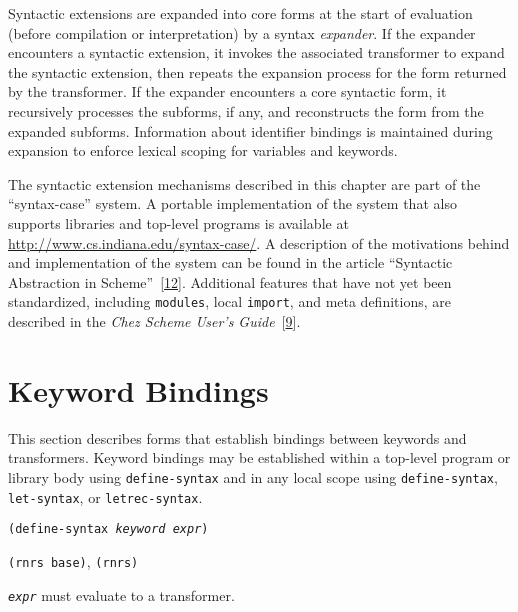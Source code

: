Syntactic extensions are expanded into core forms at the start of
evaluation (before compilation or interpretation) by a syntax \textit{expander}.
If the expander encounters a syntactic extension, it invokes
the associated transformer to expand the syntactic extension, then
repeats the expansion process for the form returned by the transformer.
If the expander encounters a core syntactic form, it recursively
processes the subforms, if any, and reconstructs the form from the
expanded subforms.
Information about identifier bindings is maintained during expansion
to enforce lexical scoping for variables and keywords.


The syntactic extension mechanisms described in this chapter are part of
the ``syntax-case'' system.
A portable implementation of the system that also supports libraries
and top-level programs is available at
\url{http://www.cs.indiana.edu/syntax-case/}.
A description of the motivations behind and implementation of the
system can be found in the article
``Syntactic Abstraction in Scheme'' [\hyperref[bibliography_g230]{12}].
Additional features that have not yet been standardized, including
\texttt{modules}, local \texttt{import}, and meta definitions, are
described in the \textit{Chez Scheme User's Guide} [\hyperref[bibliography_g227]{9}].


\section{\label{syntax_g134}\label{syntax_h1}Keyword Bindings\label{syntax_SECTSYNTAXDEFINITIONS}}



This section describes forms that establish
bindings between \label{syntax_s11}keywords and transformers.
Keyword bindings may be established within a top-level program
or library body using \texttt{define-syntax} and in any local
scope using \texttt{define-syntax}, \texttt{let-syntax}, or
\texttt{letrec-syntax}.

\begin{description}

\label{syntax_s12}\item[syntax] \texttt{(define-syntax \textit{keyword} \textit{expr})}



\item[libraries] \texttt{(rnrs base)}, \texttt{(rnrs)}
\end{description}

\texttt{\textit{expr}} must evaluate to a transformer.

